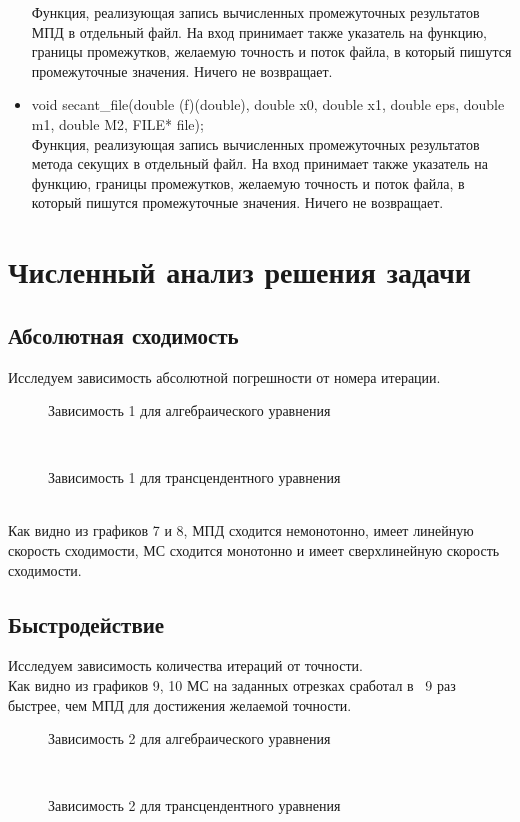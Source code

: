 \documentclass[12pt]{article}
\begin{document}
\begin{itemize}
Функция, реализующая запись вычисленных промежуточных результатов МПД в отдельный файл. На вход принимает также указатель на функцию, границы промежутков, желаемую точность и поток файла, в который пишутся промежуточные значения. Ничего не возвращает.\\
\item void secant\_file(double (f)(double), double x0, double x1, double eps, double m1, double M2, FILE* file);\\
Функция, реализующая запись вычисленных промежуточных результатов метода секущих в отдельный файл. На вход принимает также указатель на функцию, границы промежутков, желаемую точность и поток файла, в который пишутся промежуточные значения. Ничего не возвращает.\\
\end{itemize}
\section{Численный анализ решения задачи}
\subsection{Абсолютная сходимость}
Исследуем зависимость абсолютной погрешности от номера итерации.
\begin{figure}[h!]
\caption{Зависимость 1 для алгебраического уравнения}
\label{fig:Зависимость 1 для алгебраического уравнения}
\end{figure}\\
\begin{figure}[h!]
\caption{Зависимость 1 для трансцендентного уравнения}
\label{fig:Зависимость 1 для трансцендентного уравнения}
\end{figure}\\
\newpage
Как видно из графиков 7 и 8, МПД сходится немонотонно, имеет линейную скорость сходимости, МС сходится монотонно и имеет сверхлинейную скорость сходимости.\\

\subsection{Быстродействие}
Исследуем зависимость количества итераций от точности.\\
Как видно из графиков 9, 10 МС на заданных отрезках сработал в ~9 раз быстрее, чем МПД для достижения желаемой точности.
\begin{figure}[h!]
\caption{Зависимость 2 для алгебраического уравнения}
\label{fig:Зависимость 2 для алгебраического уравнения}
\end{figure}\\
\begin{figure}[h!]
\caption{Зависимость 2 для трансцендентного уравнения}
\label{fig:Зависимость 2 для трансцендентного уравнения}
\end{figure}\\
\newpage
\end{document}
